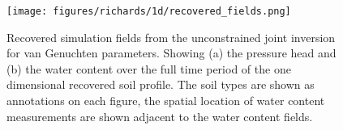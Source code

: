 \begin{figure}[ht]
\begin{center}
\texttt{[image: figures/richards/1d/recovered\_fields.png]}
\end{center}
\caption{
Recovered simulation fields from the unconstrained joint inversion for van Genuchten parameters.
Showing (a) the pressure head and (b) the water content over the full time period of the one dimensional recovered soil profile.
The soil types are shown as annotations on each figure, the spatial location of water content measurements
are shown adjacent to the water content fields.
}
\label{fig:richards-1d-recovered_fields}
\end{figure}
